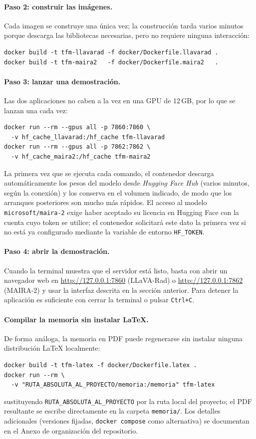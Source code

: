 \documentclass[12pt,a4paper]{report}
\begin{document}
\paragraph{Paso 2: construir las imágenes.} Cada imagen se construye una única vez; la construcción
tarda varios minutos porque descarga las bibliotecas necesarias, pero no requiere ninguna interacción:
\begin{verbatim}
docker build -t tfm-llavarad -f docker/Dockerfile.llavarad .
docker build -t tfm-maira2   -f docker/Dockerfile.maira2   .
\end{verbatim}

\paragraph{Paso 3: lanzar una demostración.} Las dos aplicaciones no caben a la vez en una GPU de
12\,GB, por lo que se lanzan una cada vez:
\begin{verbatim}
docker run --rm --gpus all -p 7860:7860 \
  -v hf_cache_llavarad:/hf_cache tfm-llavarad
docker run --rm --gpus all -p 7862:7862 \
  -v hf_cache_maira2:/hf_cache tfm-maira2
\end{verbatim}
La primera vez que se ejecuta cada comando, el contenedor descarga automáticamente los pesos del
modelo desde \textit{Hugging Face Hub} (varios minutos, según la conexión) y los conserva en el
volumen indicado, de modo que los arranques posteriores son mucho más rápidos. El acceso al modelo
\texttt{microsoft/maira-2} exige haber aceptado su licencia en Hugging Face con la cuenta cuyo token
se utilice; el contenedor solicitará este dato la primera vez si no está ya configurado mediante la
variable de entorno \texttt{HF\_TOKEN}.

\paragraph{Paso 4: abrir la demostración.} Cuando la terminal muestra que el servidor está listo,
basta con abrir un navegador web en \url{http://127.0.0.1:7860} (LLaVA-Rad) o
\url{http://127.0.0.1:7862} (MAIRA-2) y usar la interfaz descrita en la sección anterior. Para
detener la aplicación es suficiente con cerrar la terminal o pulsar \texttt{Ctrl+C}.

\paragraph{Compilar la memoria sin instalar LaTeX.} De forma análoga, la memoria en PDF puede
regenerarse sin instalar ninguna distribución LaTeX localmente:
\begin{verbatim}
docker build -t tfm-latex -f docker/Dockerfile.latex .
docker run --rm \
  -v "RUTA_ABSOLUTA_AL_PROYECTO/memoria:/memoria" tfm-latex
\end{verbatim}
sustituyendo \texttt{RUTA\_ABSOLUTA\_AL\_PROYECTO} por la ruta local del proyecto; el PDF resultante
se escribe directamente en la carpeta \texttt{memoria/}. Los detalles adicionales (versiones fijadas,
\texttt{docker compose} como alternativa) se documentan en el Anexo de organización del repositorio.
\end{document}
